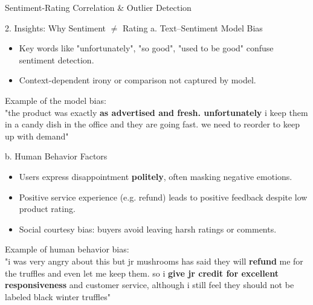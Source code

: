 \begin{frame}{Sentiment-Rating Correlation \& Outlier Detection}
    
	\scriptsize
	\begin{block}{2. Insights: Why Sentiment $\neq$ Rating}
		a. Text–Sentiment Model Bias
		\begin{itemize}
			\item Key words like "unfortunately", "so good", "used to be good" confuse sentiment detection.
			\item Context-dependent irony or comparison not captured by model.
		\end{itemize}

		\vspace{5pt}
		Example of the model bias:\\
		"the product was exactly \textbf{as advertised and fresh. unfortunately} i keep them in a candy dish in the office and they are going fast. we need to reorder to keep up with demand"
		
		\vspace{5pt}
		b. Human Behavior Factors
		\begin{itemize}
			\item Users express disappointment \textbf{politely}, often masking negative emotions.
			\item Positive service experience (e.g. refund) leads to positive feedback despite low product rating.
			\item Social courtesy bias: buyers avoid leaving harsh ratings or comments.
		\end{itemize}

		\vspace{5pt}
		Example of human behavior bias:\\
		"i was very angry about this but jr mushrooms has said they will \textbf{refund} me for the truffles and even let me keep them. so i \textbf{give jr credit for excellent responsiveness} and customer service, although i still feel they should not be labeled black winter truffles"
	\end{block}
    


\end{frame}









